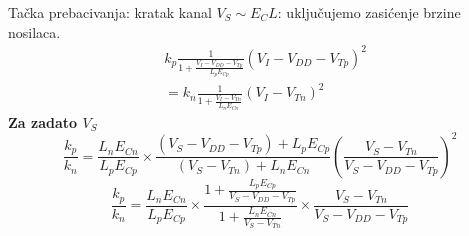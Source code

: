 \begin{frame}[label=09_2-s041]{Tačka prebacivanja: kratak kanal}
$V_S\sim E_CL$: uključujemo zasićenje brzine nosilaca.\[\begin{aligned}&k_p\frac1{1+\frac{V_I-V_{DD}-V_{Tp}}{L_pE_{Cp}}}(V_I-V_{DD}-V_{Tp})^2\\&=k_n\frac1{1+\frac{V_I-V_{Tn}}{L_nE_{Cn}}}(V_I-V_{Tn})^2\end{aligned}\]
\textbf{Za zadato $V_S$}\[\frac{k_p}{k_n}=\frac{L_nE_{Cn}}{L_pE_{Cp}}\times\frac{(V_S-V_{DD}-V_{Tp})+L_pE_{Cp}}{(V_S-V_{Tn})+L_nE_{Cn}}\left(\frac{V_S-V_{Tn}}{V_S-V_{DD}-V_{Tp}}\right)^2\]
\[\frac{k_p}{k_n}=\frac{L_nE_{Cn}}{L_pE_{Cp}}\times\frac{1+\frac{L_pE_{Cp}}{V_S-V_{DD}-V_{Tp}}}{1+\frac{L_nE_{Cn}}{V_S-V_{Tn}}}\times\frac{V_S-V_{Tn}}{V_S-V_{DD}-V_{Tp}}\]

\end{frame}
